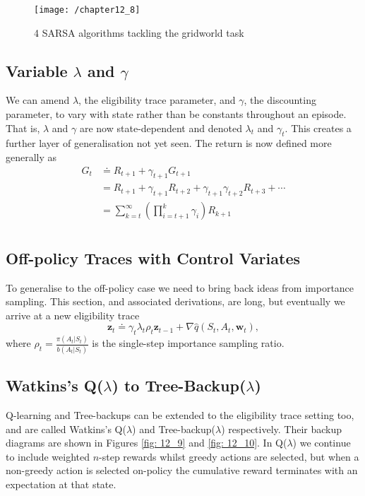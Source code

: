 \begin{figure}
	\centering
	\texttt{[image: /chapter12\_8]}
	\caption{4 SARSA algorithms tackling the gridworld task}
	\label{fig: 12_8}
\end{figure}

\subsection{Variable $\lambda$ and $\gamma$}
We can amend $\lambda$, the eligibility trace parameter, and $\gamma$, the discounting parameter, to vary with state rather than be constants throughout an episode. That is, $\lambda$ and $\gamma$ are now state-dependent and denoted $\lambda_t$ and $\gamma_t$. This creates a further layer of generalisation not yet seen. The return is now defined more generally as
\begin{align}
	G_t &\doteq R_{t+1} + \gamma_{t+1}G_{t+1} \\
	&= R_{t+1} + \gamma_{t+1}R_{t+2} + \gamma_{t+1}\gamma_{t+2}R_{t+3} + \cdots \\
	&= \sum_{k=t}^{\infty} \left(\prod_{i=t+1}^{k} \gamma_i\right) R_{k+1} \\
\end{align}

\subsection{Off-policy Traces with Control Variates}
To generalise to the off-policy case we need to bring back ideas from importance sampling. This section, and associated derivations, are long, but eventually we arrive at a new eligibility trace
\begin{equation}
\textbf{z}_t \doteq \gamma_t \lambda_t \rho_t \textbf{z}_{t-1} + \nabla \hat{q}(S_t, A_t, \textbf{w}_t), 
\end{equation}
where $\rho_t = \frac{\pi(A_t | S_t)}{b(A_t | S_t)}$ is the single-step importance sampling ratio.

\subsection{Watkins's Q($\lambda$) to Tree-Backup($\lambda$)}
Q-learning and Tree-backups can be extended to the eligibility trace setting too, and are called Watkins's Q($\lambda$) and Tree-backup($\lambda$) respectively. Their backup diagrams are shown in Figures \ref{fig: 12_9} and \ref{fig: 12_10}. In Q($\lambda$) we continue to include weighted $n$-step rewards whilst greedy actions are selected, but when a non-greedy action is selected on-policy the cumulative reward terminates with an expectation at that state.

